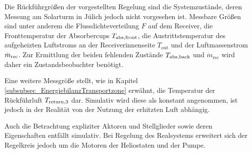 Die Rückführgrößen der vorgestellten Regelung sind die Systemzustände, deren Messung am Solarturm in Jülich jedoch nicht vorgesehen ist.
Messbare Größen sind unter anderem die Flussdichteverteilung $F$ auf dem Receiver, die Fronttemperatur der Absorbercups $T_{\mathrm{abs,front}}$, die Austrittstemperatur des aufgeheizten Luftstroms an der Receiverinnenseite $T_{\mathrm{out}}$ und der Luftmassenstrom $\dot{m}_{\mathrm{rec}}$.
Zur Ermittlung der beiden fehlenden Zustände $T_{\mathrm{abs,back}}$ und $\ddot{m}_{\mathrm{rec}}$ wird daher ein Zustandsbeobachter benötigt.

Eine weitere Messgröße stellt, wie in Kapitel \ref{subsubsec_EnergiebilanzTransportzone} erwähnt, die Temperatur der Rückführluft $T_{\mathrm{return,}3}$ dar.
Simulativ wird diese als konstant angenommen, ist jedoch in der Realität von der Nutzung der erhitzten Luft abhängig.

Auch die Betrachtung expliziter Aktoren und Stellglieder sowie deren Eigenschaften entfällt simulativ.
Bei Regelung des Realsystems erweitert sich der Regelkreis jedoch um die Motoren der Heliostaten und der Pumpe.
